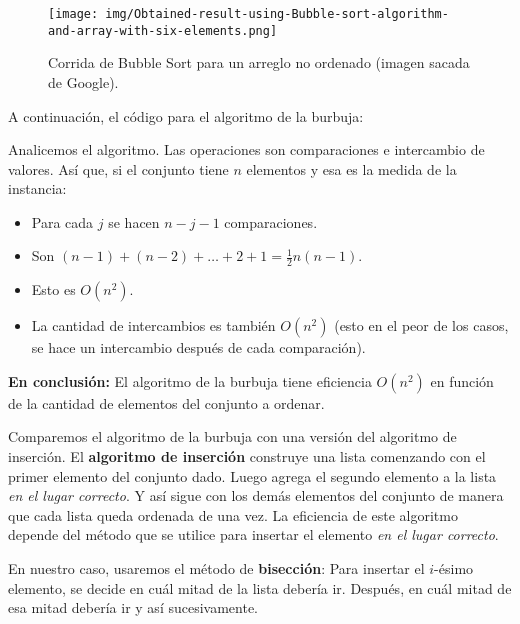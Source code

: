 \begin{figure}[h]
    \centering
    \texttt{[image: img/Obtained-result-using-Bubble-sort-algorithm-and-array-with-six-elements.png]}
    \caption{Corrida de Bubble Sort para un arreglo no ordenado (imagen sacada de Google).}
\end{figure}

A continuación, el código para el algoritmo de la burbuja:

\begin{algoritmo}
    \caption{Bubble Sort}\label{alg:bubble}
\end{algoritmo}

\break

Analicemos el algoritmo. Las operaciones son comparaciones e intercambio de valores. Así que, si el conjunto tiene $n$ elementos y esa es la medida de la instancia:

\begin{itemize}
    \item Para cada $j$ se hacen $n - j - 1$ comparaciones.
    \item Son $(n-1) + (n-2) + \dots + 2 + 1 = \frac{1}{2}n(n-1)$.
    \item Esto es $O(n^2)$.
    \item La cantidad de intercambios es también $O(n^2)$ (esto en el peor de los casos, se hace un intercambio después de cada comparación).
\end{itemize}

\textbf{En conclusión:} El algoritmo de la burbuja tiene eficiencia $O(n^2)$ en función de la cantidad de elementos del conjunto a ordenar.

Comparemos el algoritmo de la burbuja con una versión del algoritmo de inserción. El \textbf{algoritmo de inserción} construye una lista comenzando con el primer elemento del conjunto dado. Luego agrega el segundo elemento a la lista \textit{en el lugar correcto}. Y así sigue con los demás elementos del conjunto de manera que cada lista queda ordenada de una vez. La eficiencia de este algoritmo depende del método que se utilice para insertar el elemento \textit{en el lugar correcto}.

En nuestro caso, usaremos el método de \textbf{bisección}: Para insertar el $i$-ésimo elemento, se decide en cuál mitad de la lista debería ir. Después, en cuál mitad de esa mitad debería ir y así sucesivamente.

